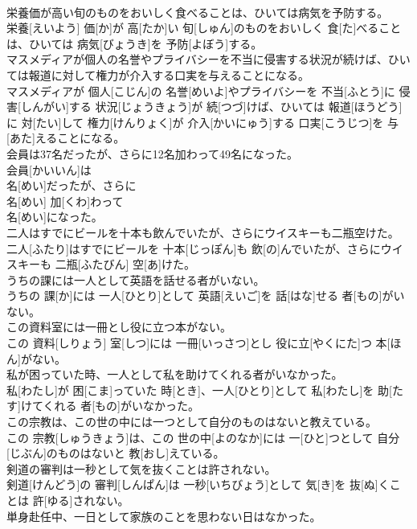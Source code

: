 \documentclass[8pt]{extreport}
\begin{document}
\begin{CJK}{UTF8}{min}
\\	栄養価が高い旬のものをおいしく食べることは、ひいては病気を予防する。	
\\	栄養[えいよう] 価[か]が 高[たか]い 旬[しゅん]のものをおいしく 食[た]べることは、ひいては 病気[びょうき]を 予防[よぼう]する。
\\	マスメディアが個人の名誉やプライバシーを不当に侵害する状況が続けば、ひいては報道に対して権力が介入する口実を与えることになる。	
\\	マスメディアが 個人[こじん]の 名誉[めいよ]やプライバシーを 不当[ふとう]に 侵害[しんがい]する 状況[じょうきょう]が 続[つづ]けば、ひいては 報道[ほうどう]に 対[たい]して 権力[けんりょく]が 介入[かいにゅう]する 口実[こうじつ]を 与[あた]えることになる。
\\	会員は37名だったが、さらに12名加わって49名になった。	
\\	会員[かいいん]は 
\\	名[めい]だったが、さらに 
\\	名[めい] 加[くわ]わって 
\\	名[めい]になった。
\\	二人はすでにビールを十本も飲んでいたが、さらにウイスキーも二瓶空けた。	
\\	二人[ふたり]はすでにビールを 十本[じっぽん]も 飲[の]んでいたが、さらにウイスキーも 二瓶[ふたびん] 空[あ]けた。
\\	うちの課には一人として英語を話せる者がいない。	
\\	うちの 課[か]には 一人[ひとり]として 英語[えいご]を 話[はな]せる 者[もの]がいない。
\\	この資料室には一冊とし役に立つ本がない。	
\\	この 資料[しりょう] 室[しつ]には 一冊[いっさつ]とし 役に立[やくにた]つ 本[ほん]がない。
\\	私が困っていた時、一人として私を助けてくれる者がいなかった。	
\\	私[わたし]が 困[こま]っていた 時[とき]、一人[ひとり]として 私[わたし]を 助[たす]けてくれる 者[もの]がいなかった。
\\	この宗教は、この世の中には一つとして自分のものはないと教えている。	
\\	この 宗教[しゅうきょう]は、この 世の中[よのなか]には 一[ひと]つとして 自分[じぶん]のものはないと 教[おし]えている。
\\	剣道の審判は一秒として気を抜くことは許されない。	
\\	剣道[けんどう]の 審判[しんぱん]は 一秒[いちびょう]として 気[き]を 抜[ぬ]くことは 許[ゆる]されない。
\\	単身赴任中、一日として家族のことを思わない日はなかった。	

\end{CJK}
\end{document}
